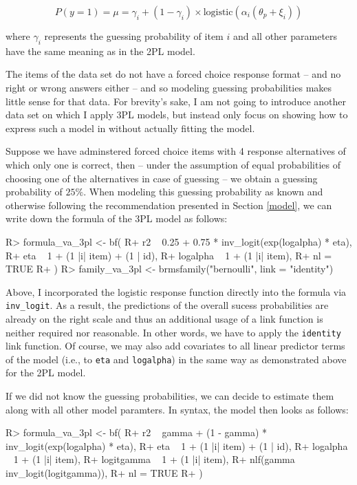\documentclass[jss]{jss}
\begin{document}
\[
P(y = 1) = \mu = \gamma_i + (1 - \gamma_i) \times \text{logistic}(\alpha_i (\theta_p + \xi_i))
\]

where \(\gamma_i\) represents the guessing probability of item \(i\) and
all other parameters have the same meaning as in the 2PL model.

The items of the  data set do not have a forced choice
response format -- and no right or wrong answers either -- and so
modeling guessing probabilities makes little sense for that data. For
brevity's sake, I am not going to introduce another data set on which I
apply 3PL models, but instead only focus on showing how to express such
a model in  without actually fitting the model.

Suppose we have adminstered forced choice items with 4 response
alternatives of which only one is correct, then -- under the assumption
of equal probabilities of choosing one of the alternatives in case of
guessing -- we obtain a guessing probability of \(25\%\). When modeling
this guessing probability as known and otherwise following the
recommendation presented in Section \ref{model}, we can write down the
formula of the 3PL model as follows:

\begin{CodeChunk}

\begin{CodeInput}
R> formula_va_3pl <- bf(
R+   r2 ~ 0.25 + 0.75 * inv_logit(exp(logalpha) * eta),
R+   eta ~ 1 + (1 |i| item) + (1 | id),
R+   logalpha ~ 1 + (1 |i| item),
R+   nl = TRUE
R+ )
R> family_va_3pl <- brmsfamily("bernoulli", link = "identity")
\end{CodeInput}
\end{CodeChunk}

Above, I incorporated the logistic response function directly into the
formula via \texttt{inv\_logit}. As a result, the predictions of the
overall sucess probabilities are already on the right scale and thus an
additional usage of a link function is neither required nor reasonable.
In other words, we have to apply the \texttt{identity} link function. Of
course, we may also add covariates to all linear predictor terms of the
model (i.e., to \texttt{eta} and \texttt{logalpha}) in the same way as
demonstrated above for the 2PL model.

If we did not know the guessing probabilities, we can decide to estimate
them along with all other model paramters. In  syntax, the
model then looks as follows:

\begin{CodeChunk}

\begin{CodeInput}
R> formula_va_3pl <- bf(
R+   r2 ~ gamma + (1 - gamma) * inv_logit(exp(logalpha) * eta),
R+   eta ~ 1 + (1 |i| item) + (1 | id),
R+   logalpha ~ 1 + (1 |i| item),
R+   logitgamma ~ 1 + (1 |i| item),
R+   nlf(gamma ~ inv_logit(logitgamma)),
R+   nl = TRUE
R+ )
\end{CodeInput}
\end{CodeChunk}
\end{document}
